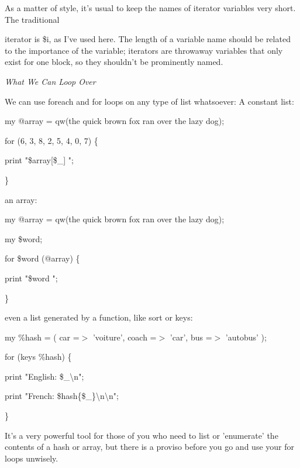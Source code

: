 \documentclass[a4paper,11pt]{book}
\begin{document}
\noindent As  a matter of style,  it's usual  to  keep  the  names  of iterator  variables  very  short.  The traditional

\noindent iterator  is \$i,  as I've used here.  The  length  of  a  variable  name  should  be  related  to  the importance  of the variable;  iterators are throwaway  variables  that  only  exist  for  one block,  so  they  shouldn't  be prominently named.

\noindent 

\noindent \textit{What We Can Loop Over}

\noindent We can use foreach and for loops on any type of list whatsoever: A constant list:

\noindent 

\noindent my @array = qw(the quick brown fox ran over the lazy dog);

\noindent for (6, 3, 8, 2, 5, 4, 0, 7) \{

\noindent print "\$array[\$\_] ";

\noindent \}

\noindent 

\noindent an array:

\noindent 

\noindent my @array = qw(the quick brown fox ran over the lazy dog);

\noindent my \$word;

\noindent for \$word (@array) \{

\noindent print "\$word ";

\noindent \}

\noindent 

\noindent even a list generated by a function, like sort or keys:

\noindent 

\noindent my \%hash = ( car =$>$ 'voiture', coach =$>$ 'car', bus =$>$ 'autobus' );

\noindent for (keys \%hash) \{

\noindent print "English: \$\_\textbackslash n";

\noindent print "French: \$hash\{\$\_\}\textbackslash n\textbackslash n";

\noindent \}

\noindent 

\noindent It's a very powerful tool for those of you who need to list or 'enumerate' the contents of a hash or array, but there is a proviso before you go and use your for loops unwisely.

\noindent 
\end{document}
